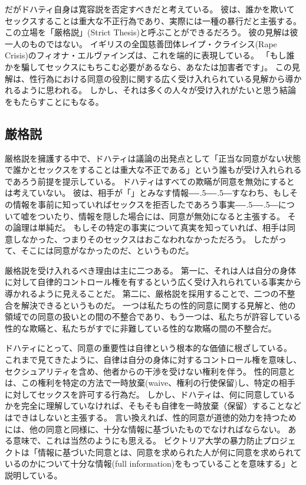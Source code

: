 \documentclass[paper=a4,book,openany]{jlreq}
\def\DDASH{―\kern-.5\zw―\kern-.5\zw―}
\begin{document}
だがドハティ自身は寛容説を否定すべきだと考えている。
彼は、誰かを欺いてセックスすることは重大な不正行為であり、実際には一種の暴行だと主張する。
この立場を「厳格説」(Strict Thesis)と呼ぶことができるだろう。
彼の見解は彼一人のものではない。
イギリスの全国慈善団体レイプ・クライシス(Rape Crisis)のフィオナ・エルヴァインズは、これを端的に表現している。
「もし誰かを騙してセックスにもちこむ必要があるなら、あなたは加害者です」\citep{sanghani14:_lied_your_way_sex}。
この見解は、性行為における同意の役割に関する広く受け入れられている見解から導かれるように思われる。
しかし、それは多くの人々が受け入れがたいと思う結論をもたらすことにもなる。

\subsection{厳格説}

厳格説を擁護する中で、ドハティは議論の出発点として「正当な同意がない状態で誰かとセックスをすることは重大な不正である」という誰もが受け入れられるであろう前提を提示している\citep[p.722]{dougherty13:_sex_lies_consen}。
ドハティはすべての欺瞞が同意を無効にするとは考えていない。
彼は、相手が「」とみなす情報{\DDASH}すなわち、もしその情報を事前に知っていればセックスを拒否したであろう事実{\DDASH}について嘘をついたり、情報を隠した場合には、同意が無効になると主張する。
その論理は単純だ。
もしその特定の事実について真実を知っていれば、相手は同意しなかった、つまりそのセックスはおこなわれなかっただろう。
したがって、そこには同意がなかったのだ、というものだ。

厳格説を受け入れるべき理由は主に二つある。
第一に、それは人は自分の身体に対して自律的コントロール権を有するという広く受け入れられている事実から導かれるように見えることだ。
第二に、厳格説を採用することで、二つの不整合を解決できるというものだ。
一つは私たちの性的同意に関する見解と、他の領域での同意の扱いとの間の不整合であり、もう一つは、私たちが許容している性的な欺瞞と、私たちがすでに非難している性的な欺瞞の間の不整合だ。

ドハティにとって、同意の重要性は自律という根本的な価値に根ざしている。
これまで見てきたように、自律は自分の身体に対するコントロール権を意味し、セクシュアリティを含め、他者からの干渉を受けない権利を伴う。
性的同意とは、この権利を特定の方法で一時放棄(waive、権利の行使保留)し、特定の相手に対してセックスを許可する行為だ。
しかし、ドハティは、何に同意しているかを完全に理解していなければ、そもそも自律を一時放棄（保留）することなどはできはしないと主張する。
言い換えれば、性的同意が道徳的効力を持つためには、他の同意と同様に、十分な情報に基づいたものでなければならない。
ある意味で、これは当然のようにも思える。
ビクトリア大学の暴力防止プロジェクトは「情報に基づいた同意とは、同意を求められた人が何に同意を求められているのかについて十分な情報(full information)をもっていることを意味する」と説明している\citep{project25:_consen}。
\end{document}
